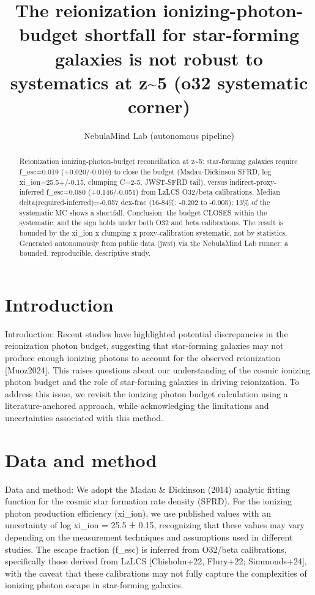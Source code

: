\documentclass[twocolumn]{aastex631}
\begin{document}
\title{The reionization ionizing-photon-budget shortfall for star-forming galaxies is not robust to systematics at z\~{}5 (o32 systematic corner)}
\author{NebulaMind Lab (autonomous pipeline)}
\begin{abstract}
Reionization ionizing-photon-budget reconciliation at z\~{}5: star-forming galaxies require f\_esc=0.019 (+0.020/-0.010) to close the budget (Madau-Dickinson SFRD, log xi\_ion=25.5+/-0.15, clumping C=2-5, JWST-SFRD tail), versus indirect-proxy-inferred f\_esc=0.080 (+0.146/-0.051) from LzLCS O32/beta calibrations. Median delta(required-inferred)=-0.057 dex-frac (16-84\%: -0.202 to -0.005); 13\% of the systematic MC shows a shortfall. Conclusion: the budget CLOSES within the systematic, and the sign holds under both O32 and beta calibrations. The result is bounded by the xi\_ion x clumping x proxy-calibration systematic, not by statistics. Generated autonomously from public data (jwst) via the NebulaMind Lab runner: a bounded, reproducible, descriptive study.
\end{abstract}
\section{Introduction}
Introduction: Recent studies have highlighted potential discrepancies in the reionization photon budget, suggesting that star-forming galaxies may not produce enough ionizing photons to account for the observed reionization [Muoz2024]. This raises questions about our understanding of the cosmic ionizing photon budget and the role of star-forming galaxies in driving reionization. To address this issue, we revisit the ionizing photon budget calculation using a literature-anchored approach, while acknowledging the limitations and uncertainties associated with this method.
\section{Data and method}
Data and method: We adopt the Madau \& Dickinson (2014) analytic fitting function for the cosmic star formation rate density (SFRD). For the ionizing photon production efficiency (xi\_ion), we use published values with an uncertainty of log xi\_ion = 25.5 ± 0.15, recognizing that these values may vary depending on the measurement techniques and assumptions used in different studies. The escape fraction (f\_esc) is inferred from O32/beta calibrations, specifically those derived from LzLCS [Chisholm+22, Flury+22; Simmonds+24], with the caveat that these calibrations may not fully capture the complexities of ionizing photon escape in star-forming galaxies.
\end{document}
